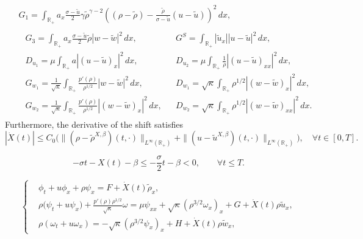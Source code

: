 \documentclass[10pt,a4paper]{amsart}
\begin{document}
\begin{proposition}
\begin{equation}
    \begin{split}
        &\begin{aligned}
         G_1 = \int_{\mathbb{R}_+} a_x \frac{\sigma-\tilde{u}}{2}\gamma\tilde{\rho}^{\gamma-2}\left((\rho-\tilde{\rho})-\frac{\tilde{\rho}}{\sigma-\tilde{u}}(u-\tilde{u})\right)^2\,dx,   
        \end{aligned}\\
        &\begin{aligned}
        &G_3 = \int_{\mathbb{R}_+} a_x \frac{\sigma-\tilde{u}}{2}\tilde{\rho}|w-\tilde{w}|^2\,dx, &&
        G^S = \int_{\mathbb{R}_+} |\tilde{u}_x| |u- \tilde{u}|^2\,dx, \\
        &D_{u_1} = \mu \int_{\mathbb{R}_+} a |(u - \tilde{u})_x|^2\,dx, &&
        D_{u_2} = \mu \int_{\mathbb{R}_+} \frac{1}{\rho} |(u - \tilde{u})_{xx}|^2\,dx, \\
        &G_{w_1} = \frac{1}{\sqrt{\kappa}} \int_{\mathbb{R}_+} \frac{p'(\rho)}{\rho^{1/2}} |w - \tilde{w}|^2\,dx, &&
        D_{w_1} = \sqrt{\kappa} \int_{\mathbb{R}_+} \rho^{1/2} |(w - \tilde{w})_x|^2\,dx, \\
        &G_{w_2} = \frac{1}{\sqrt{\kappa}} \int_{\mathbb{R}_+} \frac{p'(\rho)}{\rho^{1/2}} |(w - \tilde{w})_x|^2\,dx, &&
        D_{w_2} = \sqrt{\kappa} \int_{\mathbb{R}_+} \rho^{1/2} |(w - \tilde{w})_{xx}|^2\,dx.
        \end{aligned}
    \end{split}
    \end{equation}
    Furthermore, the derivative of the shift satisfies 
    \[
    |\dot{X}(t)| \leq C_0 \big( \| (\rho - \tilde{\rho}^{X, \beta})(t,\cdot) \|_{L^\infty(\mathbb{R}_+)} + \| (u - \tilde{u}^{X, \beta})(t,\cdot) \|_{L^\infty(\mathbb{R}_+)} \big), \quad \forall t \in [0,T].
    \]
\end{proposition}

\begin{equation}\label{small-X}
-\sigma t - X(t) - \beta \le -\frac{\sigma}{2}t - \beta < 0,
\qquad
\forall  t\le T.
\end{equation}

\begin{equation}\label{eq:perturbed-eq}
\left\{
\begin{aligned}
&\phi_t +u \phi_x +\rho \psi_x = F+\dot{X}(t) \tilde{\rho}_x,\\
&\rho\bigl(\psi_t+u \psi_x\bigr)+\frac{p'(\rho)\rho^{1/2}}{\sqrt{\kappa}}\omega =\mu \psi_{xx}+\sqrt{\kappa} (\rho^{3/2}\omega_x)_x +G+\dot{X}(t) \rho \tilde{u}_x,\\
&\rho(\omega_t +u \omega_x) = -\sqrt{\kappa} (\rho^{3/2}\psi_x)_x+ H+ \dot{X}(t) \rho \tilde{w}_x,
\end{aligned}
\right.
\end{equation}
\end{document}
